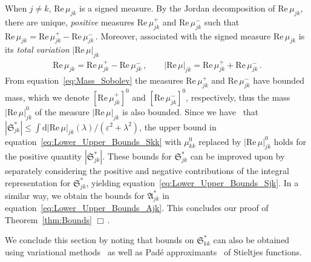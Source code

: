 \documentclass[english,12pt,jmp,graphicx]{revtex4-1}
\newcommand{\thmref}[1]{Theorem~\ref{#1}}
\newcommand{\secref}[1]{Section~\ref{#1}}
\newcommand{\numfigref}[1]{\ref{#1}}
\newcommand{\Sg}{\mathfrak{S}}
\newcommand{\Ag}{\mathfrak{A}}
\renewcommand{\d}{\mathrm{d}}
\newcommand{\Real}{\mbox{Re}\,}
\newcommand{\Imag}{\mbox{Im}\,}
\begin{document}
When $j\neq k$, $\Real\mu_{jk}$ is a signed measure. By the Jordan
decomposition of $\Real\mu_{jk}$, there are unique,
\emph{positive} measures $\Real\mu_{jk}^+$ and $\Real\mu_{jk}^-$ such that
$\Real\mu_{jk}=\Real\mu_{jk}^+-\Real\mu_{jk}^-\,.$ Moreover, 
associated with the signed measure $\Real\mu_{jk}$ is its \emph{total
  variation} $|\Real\mu|_{jk}$~\cite{Folland:99:RealAnalysis}    
%
\begin{align}\label{eq:Total_Variation}
  \Real\mu_{jk}=\Real\mu_{jk}^+-\Real\mu_{jk}^-\,,
  \qquad
  |\Real\mu|_{jk}=\Real\mu_{jk}^++\Real\mu_{jk}^-\,.
\end{align}
%
From equation~\eqref{eq:Mass_Sobolev} the measures $\Real\mu_{jk}^+$
and $\Real\mu_{jk}^-$ 
have bounded mass, which we denote $[\Real\mu_{jk}^+]^0$ and
$[\Real\mu_{jk}^-]^0$, 
respectively, thus the mass $|\Real\mu|_{jk}^0$ of the measure
$|\Real\mu|_{jk}$ is also bounded. Since we
have~\cite{Folland:99:RealAnalysis} that 
$|\Sg^*_{jk}|\leq\int\d|\Real\mu|_{jk}(\lambda)/(\varepsilon^2+\lambda^2)$, the
upper bound in equation~\eqref{eq:Lower_Upper_Bounds_Skk} with
$\mu^0_{kk}$ replaced by $|\Real\mu|_{jk}^0$ holds for the positive
quantity $|\Sg^*_{jk}|$.
These bounds for $\Sg^*_{jk}$ can be improved upon by
separately considering the positive and negative contributions of the
integral representation for  $\Sg^*_{jk}$, yielding
equation~\eqref{eq:Lower_Upper_Bounds_Sjk}. In a similar way, we
obtain the bounds for $\Ag^*_{jk}$ in
equation~\eqref{eq:Lower_Upper_Bounds_Ajk}.  
This concludes our proof of \thmref{thm:Bounds} $\Box\,.$


We conclude this section by noting that bounds on $\Sg^*_{kk}$
can also be obtained using variational
methods~\cite{Fannjiang:1994:SIAM_JAM:333,Fannjiang:1997:1033,Avellaneda:CMP-339}
as well as Pad\'{e}
approximants~\cite{Baker:1996:Book:Pade,Avellaneda:CMP-339} of
Stieltjes functions. 

\end{document}
